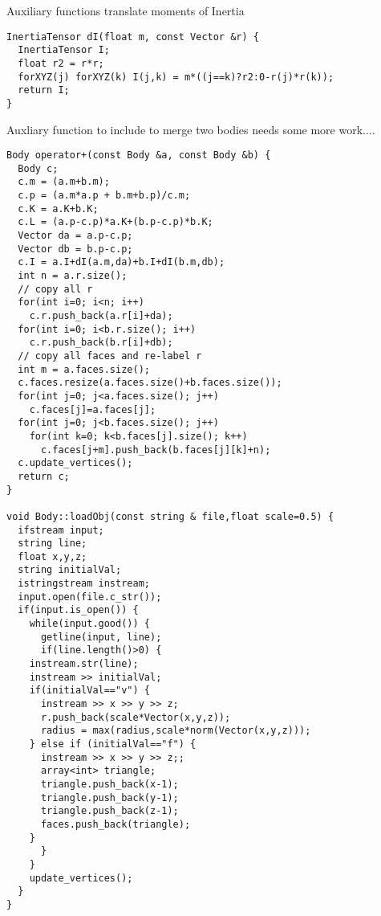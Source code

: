 Auxiliary functions translate moments of Inertia
\begin{lstlisting}
InertiaTensor dI(float m, const Vector &r) {
  InertiaTensor I;
  float r2 = r*r;
  forXYZ(j) forXYZ(k) I(j,k) = m*((j==k)?r2:0-r(j)*r(k));
  return I;
}
\end{lstlisting}

Auxliary function to include to merge two bodies
needs some more work....
\begin{lstlisting}
Body operator+(const Body &a, const Body &b) {
  Body c;
  c.m = (a.m+b.m);
  c.p = (a.m*a.p + b.m+b.p)/c.m;
  c.K = a.K+b.K;
  c.L = (a.p-c.p)*a.K+(b.p-c.p)*b.K;
  Vector da = a.p-c.p;
  Vector db = b.p-c.p;
  c.I = a.I+dI(a.m,da)+b.I+dI(b.m,db);
  int n = a.r.size();
  // copy all r
  for(int i=0; i<n; i++)
    c.r.push_back(a.r[i]+da);
  for(int i=0; i<b.r.size(); i++)
    c.r.push_back(b.r[i]+db);
  // copy all faces and re-label r  
  int m = a.faces.size();
  c.faces.resize(a.faces.size()+b.faces.size());
  for(int j=0; j<a.faces.size(); j++)
    c.faces[j]=a.faces[j];
  for(int j=0; j<b.faces.size(); j++)
    for(int k=0; k<b.faces[j].size(); k++)
      c.faces[j+m].push_back(b.faces[j][k]+n);  
  c.update_vertices();
  return c;
}

void Body::loadObj(const string & file,float scale=0.5) {
  ifstream input;
  string line;
  float x,y,z;
  string initialVal;
  istringstream instream;
  input.open(file.c_str());
  if(input.is_open()) {
    while(input.good()) {
      getline(input, line);
      if(line.length()>0) {
	instream.str(line);
	instream >> initialVal;
	if(initialVal=="v") {
	  instream >> x >> y >> z;
	  r.push_back(scale*Vector(x,y,z));
	  radius = max(radius,scale*norm(Vector(x,y,z)));
	} else if (initialVal=="f") {
	  instream >> x >> y >> z;;
	  array<int> triangle;
	  triangle.push_back(x-1);
	  triangle.push_back(y-1);
	  triangle.push_back(z-1);
	  faces.push_back(triangle);
	}
      }
    }
    update_vertices();
  }
}
\end{lstlisting}

